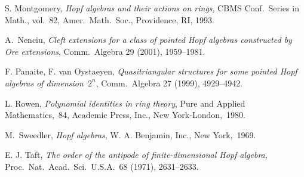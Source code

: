 \documentclass[11pt, a4paper]{amsart}
\theoremstyle{definition}
\numberwithin{equation}{section}
\begin{document}
\begin{thebibliography}{99}
 S. Montgomery, 
\emph{Hopf algebras and their actions on rings},
CBMS Conf.\ Series in Math., vol.~82, Amer.\ Math.\ Soc., Providence, RI, 1993.

A.~Nenciu, 
\emph{Cleft extensions for a class of pointed Hopf algebras constructed by Ore extensions},
Comm.\ Algebra 29 (2001), 1959--1981.

F. Panaite, F. van Oystaeyen, 
\emph{Quasitriangular structures for some pointed Hopf algebras of dimension~$2^n$}, 
Comm.\ Algebra 27 (1999), 4929--4942.

 L. Rowen, 
\emph{Polynomial identities in ring theory}, 
Pure and Applied Mathematics,~84,
Academic Press, Inc., New York-London,~1980.

 M.~Sweedler, 
\emph{Hopf algebras}, 
W. A. Benjamin, Inc., New York,~1969.

E. J. Taft, 
\emph{The order of the antipode of finite-dimensional Hopf algebra}, 
Proc.\ Nat.\ Acad.\ Sci.\ U.S.A.\ 68 (1971), 2631--2633. 

\end{thebibliography}
\end{document}
